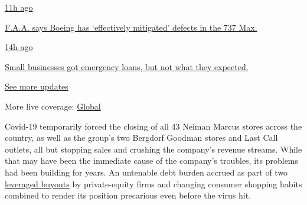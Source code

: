 \href{https://www.nytimes3xbfgragh.onion/live/2020/08/03/business/stock-market-today-coronavirus?action=click\&pgtype=Article\&state=default\&region=MAIN_CONTENT_1\&context=storylines_live_updates\#faa-says-boeing-has-effectively-mitigated-defects-in-the-737-max}{11h
ago}

\href{https://www.nytimes3xbfgragh.onion/live/2020/08/03/business/stock-market-today-coronavirus?action=click\&pgtype=Article\&state=default\&region=MAIN_CONTENT_1\&context=storylines_live_updates\#faa-says-boeing-has-effectively-mitigated-defects-in-the-737-max}{F.A.A.
says Boeing has `effectively mitigated' defects in the 737 Max.}

\href{https://www.nytimes3xbfgragh.onion/live/2020/08/03/business/stock-market-today-coronavirus?action=click\&pgtype=Article\&state=default\&region=MAIN_CONTENT_1\&context=storylines_live_updates\#small-businesses-got-emergency-loans-but-not-what-they-expected}{14h
ago}

\href{https://www.nytimes3xbfgragh.onion/live/2020/08/03/business/stock-market-today-coronavirus?action=click\&pgtype=Article\&state=default\&region=MAIN_CONTENT_1\&context=storylines_live_updates\#small-businesses-got-emergency-loans-but-not-what-they-expected}{Small
businesses got emergency loans, but not what they expected.}

\href{https://www.nytimes3xbfgragh.onion/live/2020/08/03/business/stock-market-today-coronavirus?action=click\&pgtype=Article\&state=default\&region=MAIN_CONTENT_1\&context=storylines_live_updates}{See
more updates}

More live coverage:
\href{https://www.nytimes3xbfgragh.onion/2020/08/03/world/coronavirus-covid-19.html?action=click\&pgtype=Article\&state=default\&region=MAIN_CONTENT_1\&context=storylines_live_updates}{Global}

Covid-19 temporarily forced the closing of all 43 Neiman Marcus stores
across the country, as well as the group's two Bergdorf Goodman stores
and Last Call outlets, all but stopping sales and crushing the company's
revenue streams. While that may have been the immediate cause of the
company's troubles, its problems had been building for years. An
untenable debt burden accrued as part of two
\href{https://dealbook.nytimes3xbfgragh.onion/2013/09/09/neiman-marcus-is-sold-for-6-billion/}{leveraged
buyouts} by private-equity firms and changing consumer shopping habits
combined to render its position precarious even before the virus hit.


